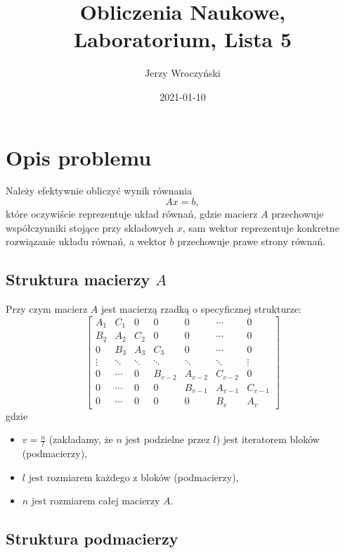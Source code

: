 \documentclass[10pt]{article}
\title{Obliczenia Naukowe,\\Laboratorium, Lista 5}
\author{Jerzy Wroczyński}
\date{2021-01-10}
\begin{document}
\maketitle

\section{Opis problemu}

Należy efektywnie obliczyć wynik równania
$$
Ax = b,
$$
które oczywiście reprezentuje układ równań, gdzie macierz $A$ przechowuje współczynniki stojące przy składowych $x$, sam wektor reprezentuje konkretne rozwiązanie układu równań, a wektor $b$ przechowuje prawe strony równań.

\subsection{Struktura macierzy $A$}

Przy czym macierz $A$ jest macierzą rzadką o specyficznej strukturze:
$$
\begin{bmatrix}
    A_1 & C_1 & 0 & 0 & 0 & \dotsb & 0\\
    B_2 & A_2 & C_2 & 0 & 0 & \dotsb & 0\\
    0 & B_3 & A_3 & C_3 & 0 & \dotsb & 0\\
    \vdots & \ddots & \ddots & \ddots & \ddots & \ddots & \vdots\\
    0 & \dotsb & 0 & B_{v-2} & A_{v-2} & C_{v-2} & 0\\
    0 & \dotsb & 0 & 0 & B_{v-1} & A_{v-1} & C_{v-1}\\
    0 & \dotsb & 0 & 0 & 0 & B_{v} & A_{v}
\end{bmatrix}
$$
gdzie
\begin{itemize}
    \item $v = \frac{n}{l}$ (zakładamy, że $n$ jest podzielne przez $l$) jest iteratorem bloków (podmacierzy),
    \item $l$ jest rozmiarem każdego z bloków (podmacierzy),
    \item $n$ jest rozmiarem całej macierzy $A$.
\end{itemize}

\subsection{Struktura podmacierzy}
\label{struktura-podmacierzy}
\end{document}
